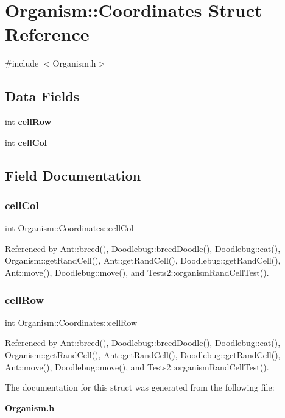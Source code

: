 \section{Organism\+:\+:Coordinates Struct Reference}
\label{structOrganism_1_1Coordinates}


{\ttfamily \#include $<$Organism.\+h$>$}

\subsection*{Data Fields}
\begin{DoxyCompactItemize}
\item 
int \textbf{ cell\+Row}
\item 
int \textbf{ cell\+Col}
\end{DoxyCompactItemize}


\subsection{Field Documentation}
\mbox{\label{structOrganism_1_1Coordinates_af549776fba430bdffc4e5db3a30bc7fb}} 
\subsubsection{cell\+Col}
{\footnotesize\ttfamily int Organism\+::\+Coordinates\+::cell\+Col}



Referenced by Ant\+::breed(), Doodlebug\+::breed\+Doodle(), Doodlebug\+::eat(), Organism\+::get\+Rand\+Cell(), Ant\+::get\+Rand\+Cell(), Doodlebug\+::get\+Rand\+Cell(), Ant\+::move(), Doodlebug\+::move(), and Tests2\+::organism\+Rand\+Cell\+Test().

\mbox{\label{structOrganism_1_1Coordinates_a9bb1c31af6af3468294851c581b01e83}} 
\subsubsection{cell\+Row}
{\footnotesize\ttfamily int Organism\+::\+Coordinates\+::cell\+Row}



Referenced by Ant\+::breed(), Doodlebug\+::breed\+Doodle(), Doodlebug\+::eat(), Organism\+::get\+Rand\+Cell(), Ant\+::get\+Rand\+Cell(), Doodlebug\+::get\+Rand\+Cell(), Ant\+::move(), Doodlebug\+::move(), and Tests2\+::organism\+Rand\+Cell\+Test().



The documentation for this struct was generated from the following file\+:\begin{DoxyCompactItemize}
\item 
\textbf{ Organism.\+h}\end{DoxyCompactItemize}
